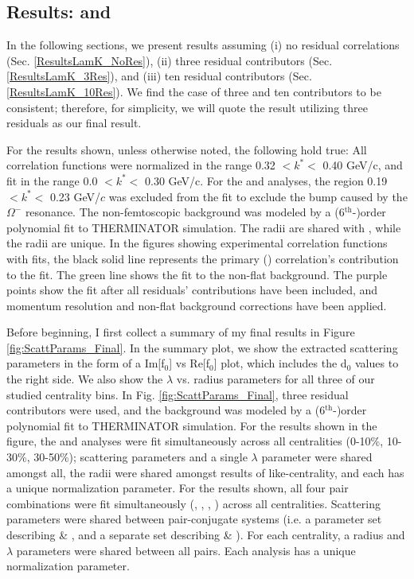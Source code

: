 \documentclass[/home/jesse/Analysis/FemtoAnalysis/AnalysisNotes/AnalysisNoteJBuxton.tex]{subfiles}
\begin{document}
\subsection{Results: \LamKs and \LamKpm}
\label{ResultsLamK}

In the following sections, we present results assuming (i) no residual correlations (Sec. \ref{ResultsLamK_NoRes}), (ii) three residual contributors (Sec. \ref{ResultsLamK_3Res}), and (iii) ten residual contributors (Sec. \ref{ResultsLamK_10Res}).  We find the case of three and ten contributors to be consistent; therefore, for simplicity, we will quote the result utilizing three residuals as our final result.

For the results shown, unless otherwise noted, the following hold true:
All correlation functions were normalized in the range 0.32 $< k^{*} <$ 0.40 GeV/c, and fit in the range 0.0 $< k^{*} <$ 0.30 GeV/c.
For the \LamKchM and \ALamKchP analyses, the region 0.19 $< k^{*} <$ 0.23 GeV/$c$ was excluded from the fit to exclude the bump caused by the $\Omega^{-}$ resonance.
The non-femtoscopic background was modeled by a (6$^{\mathrm{th}}$-)order polynomial fit to THERMINATOR simulation.
The \LamKchPALamKchM radii are shared with \LamKchMALamKchP, while the \LamKsALamKs radii are unique.
In the figures showing experimental correlation functions with fits, the black solid line represents the primary (\LamK) correlation's contribution to the fit.
The green line shows the fit to the non-flat background.  
The purple points show the fit after all residuals' contributions have been included, and momentum resolution and non-flat background corrections have been applied.


Before beginning, I first collect a summary of my final results in Figure \ref{fig:ScattParams_Final}.  
In the summary plot, we show the extracted scattering parameters in the form of a Im[f$_{0}$] vs Re[f$_{0}$] plot, which includes the d$_{0}$ values to the right side.  
We also show the $\lambda$ vs. radius parameters for all three of our studied centrality bins.  
In Fig. \ref{fig:ScattParams_Final}, three residual contributors were used, and the background was modeled by a (6$^{\mathrm{th}}$-)order polynomial fit to THERMINATOR simulation.  
For the \LamKs results shown in the figure, the \LamKs and \ALamKs analyses were fit simultaneously across all centralities (0-10\%, 10-30\%, 30-50\%); scattering parameters and a single $\lambda$ parameter were shared amongst all, the radii were shared amongst results of like-centrality, and each has a unique normalization parameter.  
For the \LamKpm results shown, all four pair combinations were fit simultaneously (\LamKchP, \ALamKchM, \LamKchM, \ALamKchP) across all centralities.  
Scattering parameters were shared between pair-conjugate systems (i.e. a parameter set describing \LamKchP \& \ALamKchM, and a separate set describing \LamKchM \& \ALamKchP).  
For each centrality, a radius and $\lambda$ parameters were shared between all pairs.  Each analysis has a unique normalization parameter.
\end{document}
